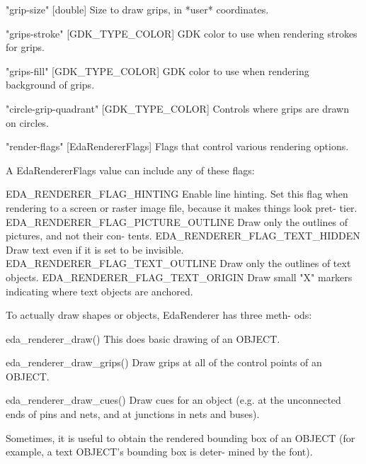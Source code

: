                 "grip-size"  [double]
                    Size to draw grips, in *user* coordinates.

                "grips-stroke"  [GDK_TYPE_COLOR]
                    GDK color to use when rendering strokes for grips.

                "grips-fill"  [GDK_TYPE_COLOR]
                    GDK color to use when rendering background of grips.

                "circle-grip-quadrant"  [GDK_TYPE_COLOR]
                    Controls where grips are drawn on circles.

                "render-flags"  [EdaRendererFlags]
                    Flags that control various rendering options.

              A EdaRendererFlags value can include any of these flags:

                EDA_RENDERER_FLAG_HINTING
                    Enable  line  hinting.  Set  this flag when rendering to a
              screen
                    or raster image file, because it makes things  look  pret-
              tier.
                EDA_RENDERER_FLAG_PICTURE_OUTLINE
                    Draw  only  the  outlines  of pictures, and not their con-
              tents.
                EDA_RENDERER_FLAG_TEXT_HIDDEN
                    Draw text even if it is set to be invisible.
                EDA_RENDERER_FLAG_TEXT_OUTLINE
                    Draw only the outlines of text objects.
                EDA_RENDERER_FLAG_TEXT_ORIGIN
                    Draw small "X" markers indicating where text objects are
                    anchored.

              To actually draw shapes or objects, EdaRenderer has three  meth-
              ods:

                eda_renderer_draw()
                    This does basic drawing of an OBJECT.

                eda_renderer_draw_grips()
                    Draw grips at all of the control points of an OBJECT.

                eda_renderer_draw_cues()
                    Draw  cues  for an object (e.g. at the unconnected ends of
              pins and
                    nets, and at junctions in nets and buses).

              Sometimes, it is useful to obtain the rendered bounding  box  of
              an  OBJECT  (for example, a text OBJECT's bounding box is deter-
              mined by the font).

